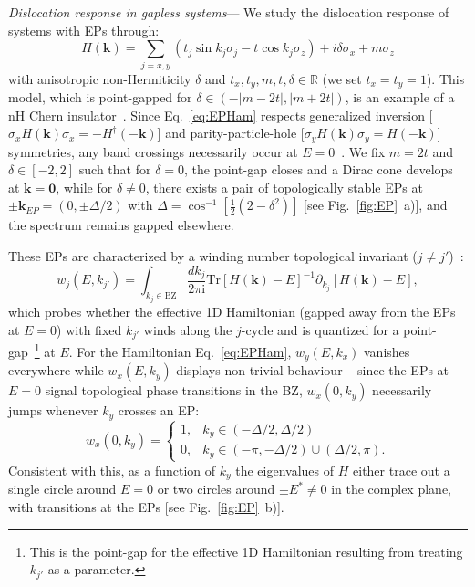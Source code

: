 \documentclass[aps,prl,twocolumn,amsmath,amssymb,floatfix,superscriptaddress]{revtex4-2}
\newcommand{\bs}[1]{\boldsymbol{#1}}
\begin{document}
\emph{Dislocation response in gapless systems}--- We study the dislocation response of systems with EPs through:
\begin{equation}
\label{eq:EPHam}
    H(\bs{k}) = \sum_{j=x,y} \left( t_j \sin k_j \sigma_j - t \cos k_j \sigma_z \right)  + i \delta \sigma_x + m \sigma_z
\end{equation}
with anisotropic non-Hermiticity $\delta$ and $t_x,t_y,m,t,\delta \in \mathbb{R}$ (we set $t_x=t_y=1$). This model, which is point-gapped for $\delta \in \left(-|m-2t|,|m+2t| \right)$, is an example of a nH Chern insulator~\cite{yao2018chern,kawabata2018anomalous}. Since Eq.~\eqref{eq:EPHam} respects generalized inversion [$\sigma_x H(\bs{k}) \sigma_x = - H^\dagger(\bs{-k})$] and parity-particle-hole [$\sigma_y H(\bs{k})\sigma_y = H(\bs{-k})$] symmetries, any band crossings necessarily occur at $E=0$~\cite{Okugawa2021}. We fix $m=2t$ and $\delta \in [-2,2]$ such that for $\delta=0$, the point-gap closes and a Dirac cone develops at $\bs{k}=\bs{0}$, while for $\delta \neq 0$, there exists a pair of topologically stable EPs at $\pm \bs{k}_{EP}=(0,\pm \Delta/2)$ with $\Delta=\cos^{-1}\left[ \frac{1}{2} (2-\delta^2) \right]$ [see Fig.~\ref{fig:EP}~a)], and the spectrum remains gapped elsewhere.

These EPs are characterized by a winding number topological invariant ($j \neq j'$)~\cite{kawabata2019semi}:
\begin{equation}
w_j(E,k_{j'})= \int_{k_j \in \mathrm{BZ}} \frac{dk_j}{2\pi \mathrm{i}} \mathrm{Tr}[H(\bs{k})-E]^{-1} \partial_{k_{j}} [H(\bs{k})-E] ,
\end{equation} 
which probes whether the effective 1D Hamiltonian (gapped away from the EPs at $E=0$) with fixed $k_{j'}$ winds along the $j$-cycle and is quantized for a point-gap~\footnote{This is the point-gap for the effective 1D Hamiltonian resulting from treating $k_{j'}$ as a parameter.} at $E$. For the Hamiltonian Eq.~\eqref{eq:EPHam}, $w_y(E,k_x)$ vanishes everywhere while $w_x(E,k_y)$ displays non-trivial behaviour -- since the EPs at $E=0$ signal topological phase transitions in the BZ, $w_x(0,k_y)$ necessarily jumps whenever $k_y$ crosses an EP:
\begin{equation}
w_x(0,k_y) = \begin{cases}
1, & k_y \in (-\Delta/2,\Delta/2)\\
0, & k_y \in (-\pi, -\Delta/2) \cup (\Delta/2,\pi) .
\end{cases}
\end{equation}
Consistent with this, as a function of $k_y$ the eigenvalues of $H$ either trace out a single circle around $E = 0$ or two circles around $\pm E^* \neq 0$ in the complex plane, with transitions at the EPs [see Fig.~\ref{fig:EP}~b)].
\end{document}
